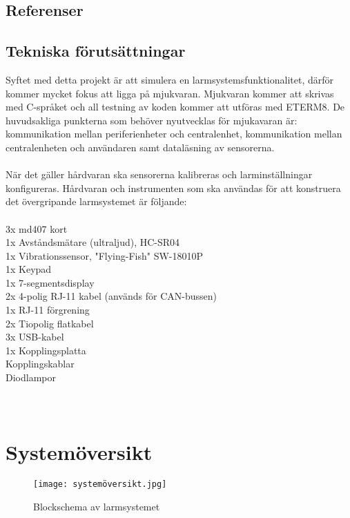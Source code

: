 \documentclass[a4paper]{article}
\begin{document}
\subsection{Referenser}
\vspace{-1cm}

\printbibliography[title=\n]

\subsection{Tekniska förutsättningar}

Syftet med detta projekt är att simulera en larmsystemsfunktionalitet, därför kommer mycket fokus att ligga på mjukvaran. Mjukvaran kommer att skrivas med C-språket och all testning av koden kommer att utföras med ETERM8. De huvudsakliga punkterna som behöver nyutvecklas för mjukavaran är: kommunikation mellan periferienheter och centralenhet, kommunikation mellan centralenheten och användaren samt dataläsning av sensorerna. \\
\\
När det gäller hårdvaran ska sensorerna kalibreras och larminställningar konfigureras. Hårdvaran och instrumenten som ska användas för att konstruera det övergripande larmsystemet är följande: \\
\\
3x md407 kort \\
1x Avståndsmätare (ultraljud), HC-SR04 \\
1x Vibrationssensor, "Flying-Fish" SW-18010P \\
1x Keypad \\
1x 7-segmentsdisplay \\
2x 4-polig RJ-11 kabel (används för CAN-bussen) \\
1x RJ-11 förgrening \\
2x Tiopolig flatkabel \\
3x USB-kabel \\
1x Kopplingsplatta \\
Kopplingskablar\\
Diodlampor\\
\\\\
\newpage
\section{Systemöversikt}

\begin{figure}[h]
\texttt{[image: systemöversikt.jpg]}
\caption {Blockschema av larmsystemet}
\label{fig:drawing}
\end{figure}
\end{document}
